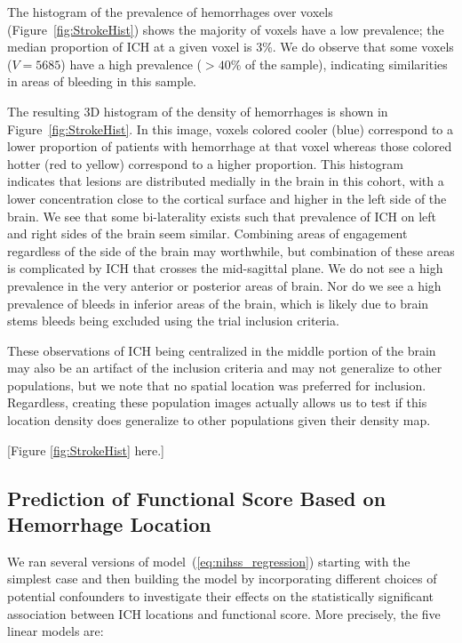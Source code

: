 \documentclass[10pt]{article}\usepackage[]{graphicx}\usepackage[]{color}
\begin{document}
The histogram of the prevalence of hemorrhages over voxels (Figure~\ref{fig:StrokeHist}\protect{}) shows the majority of voxels have a low prevalence; the median proportion of ICH at a given voxel is 3\%.  We do observe that some voxels ($V = 5685$) have a high prevalence ($> 40\%$ of the sample), indicating similarities in areas of bleeding in this sample.  


The resulting 3D histogram of the density of hemorrhages is shown in Figure~\ref{fig:StrokeHist}\protect{}.
In this image, voxels colored cooler (blue) correspond to a lower proportion of
patients with hemorrhage at that voxel whereas those colored hotter (red to yellow) correspond to a higher proportion. This histogram indicates that lesions are
distributed medially in the brain in this cohort, with a lower concentration
close to the cortical surface and higher in the left side of the brain.  We see that some bi-laterality exists such that prevalence of ICH on left and right sides of the brain seem similar.  Combining areas of engagement regardless of the side of the brain may worthwhile, but combination of these areas is complicated by ICH that crosses the mid-sagittal plane.  
We do not see a high prevalence in the very anterior or posterior areas of brain.  Nor do we see a high prevalence of bleeds in inferior areas of the brain, which is likely due to brain stems bleeds being excluded using the trial inclusion criteria.  

These observations of ICH being centralized in the middle portion of the brain may also be an artifact of the inclusion criteria and may not generalize to other populations, but we note that no spatial location was preferred for inclusion.  Regardless, creating these population images actually allows us to test if this location density does generalize to other populations given their density map.


[Figure \ref{fig:StrokeHist} here.]


\subsection*{Prediction of Functional Score Based on Hemorrhage Location}

We ran several versions of model~(\ref{eq:nihss_regression}) starting with the simplest case and then building the model by incorporating different choices of potential confounders to investigate their effects on the statistically significant association between ICH locations and functional score. More precisely, the five linear models are:
\end{document}
